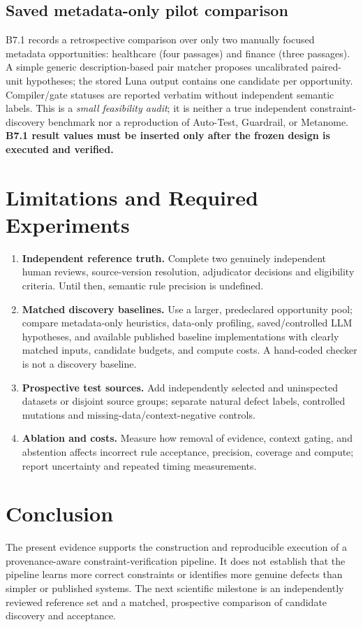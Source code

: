 \documentclass[conference]{IEEEtran}
\begin{document}
\subsection{Saved metadata-only pilot comparison}
B7.1 records a retrospective comparison over only two manually focused metadata opportunities: healthcare (four passages) and finance (three passages). A simple generic description-based pair matcher proposes uncalibrated paired-unit hypotheses; the stored Luna output contains one candidate per opportunity. Compiler/gate statuses are reported verbatim without independent semantic labels. This is a \emph{small feasibility audit}; it is neither a true independent constraint-discovery benchmark nor a reproduction of Auto-Test, Guardrail, or Metanome. \textbf{B7.1 result values must be inserted only after the frozen design is executed and verified.}

\section{Limitations and Required Experiments}
\begin{enumerate}
\item \textbf{Independent reference truth.} Complete two genuinely independent human reviews, source-version resolution, adjudicator decisions and eligibility criteria. Until then, semantic rule precision is undefined.
\item \textbf{Matched discovery baselines.} Use a larger, predeclared opportunity pool; compare metadata-only heuristics, data-only profiling, saved/controlled LLM hypotheses, and available published baseline implementations with clearly matched inputs, candidate budgets, and compute costs. A hand-coded checker is not a discovery baseline.
\item \textbf{Prospective test sources.} Add independently selected and uninspected datasets or disjoint source groups; separate natural defect labels, controlled mutations and missing-data/context-negative controls.
\item \textbf{Ablation and costs.} Measure how removal of evidence, context gating, and abstention affects incorrect rule acceptance, precision, coverage and compute; report uncertainty and repeated timing measurements.
\end{enumerate}

\section{Conclusion}
The present evidence supports the construction and reproducible execution of a provenance-aware constraint-verification pipeline. It does not establish that the pipeline learns more correct constraints or identifies more genuine defects than simpler or published systems. The next scientific milestone is an independently reviewed reference set and a matched, prospective comparison of candidate discovery and acceptance.
\end{document}
